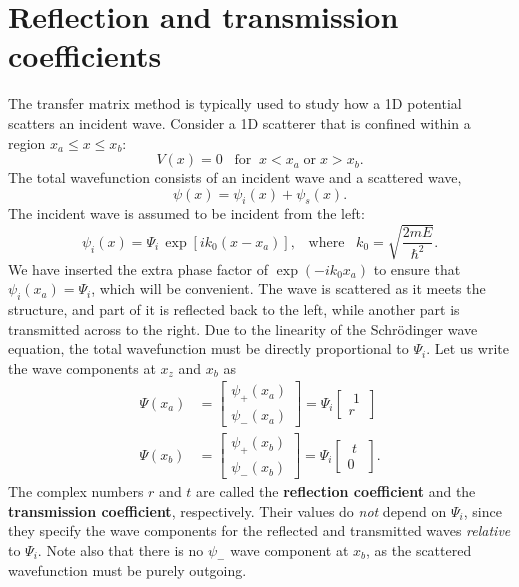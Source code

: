 \documentclass[pra,12pt]{revtex4}
\begin{document}
\section{Reflection and transmission coefficients}

The transfer matrix method is typically used to study how a 1D
potential scatters an incident wave.  Consider a 1D scatterer that is
confined within a region $x_a \le x \le x_b$:
\begin{equation}
  V(x) = 0 \;\;\;\mathrm{for}\;\;x < x_a \;\textrm{or}\; x > x_b.
\end{equation}
The total wavefunction consists of an incident wave and a scattered
wave,
\begin{equation}
  \psi(x) = \psi_i(x) + \psi_s(x).
\end{equation}
The incident wave is assumed to be incident from the left:
\begin{equation}
  \psi_i(x) = \Psi_i \, \exp[ik_0(x-x_a)], \;\;\;\textrm{where}\;\;\; k_0 = \sqrt{\frac{2mE}{\hbar^2}}.
\end{equation}
We have inserted the extra phase factor of $\exp(-ik_0x_a)$ to ensure
that $\psi_i(x_a) = \Psi_i$, which will be convenient.  The wave is
scattered as it meets the structure, and part of it is reflected back
to the left, while another part is transmitted across to the right.
Due to the linearity of the Schr\"odinger wave equation, the total
wavefunction must be directly proportional to $\Psi_i$.  Let us
write the wave components at $x_z$ and $x_b$ as
\begin{align}
  \Psi(x_a) &= \begin{bmatrix}\psi_+(x_a) \\ \psi_-(x_a) \end{bmatrix} = \Psi_i \begin{bmatrix}\,\,1\, \\ r \end{bmatrix} \\ \Psi(x_b) &= \begin{bmatrix}\psi_+(x_b) \\ \psi_-(x_b) \end{bmatrix} = \Psi_i \begin{bmatrix}\,\,t\,\, \\ 0 \end{bmatrix}.
\end{align}
The complex numbers $r$ and $t$ are called the \textbf{reflection
  coefficient} and the \textbf{transmission coefficient},
respectively.  Their values do \textit{not} depend on $\Psi_i$, since
they specify the wave components for the reflected and transmitted
waves \textit{relative} to $\Psi_i$.  Note also that there is no
$\psi_-$ wave component at $x_b$, as the scattered wavefunction
must be purely outgoing.
\end{document}
